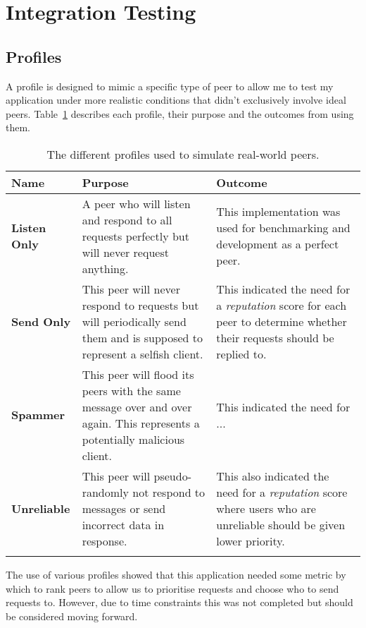\section{Integration Testing}

\subsection*{Profiles}

A profile is designed to mimic a specific type of peer to allow me to test my application under more realistic conditions that didn't exclusively involve ideal peers. Table~\ref{tab:profiles} describes each profile, their purpose and the outcomes from using them.

\small
\begin{longtable}{p{} p{} p{} }
  \toprule
  \textbf{Name} & \textbf{Purpose} & \textbf{Outcome}
  \\\midrule\midrule
  \textbf{Listen Only}
  & A peer who will listen and respond to all requests perfectly but will never request anything.
  & This implementation was used for benchmarking and development as a perfect peer.
  \\
  \textbf{Send Only}
  & This peer will never respond to requests but will periodically send them and is supposed to represent a selfish client.
  & This indicated the need for a \textit{reputation} score for each peer to determine whether their requests should be replied to.
  \\
  \textbf{Spammer}
  & This peer will flood its peers with the same message over and over again. This represents a potentially malicious client.
  & This indicated the need for ...
  \\
  \textbf{Unreliable}
  & This peer will pseudo-randomly not respond to messages or send incorrect data in response.
  & This also indicated the need for a \textit{reputation} score where users who are unreliable should be given lower priority.
  \\\bottomrule\bottomrule
  \caption{The different profiles used to simulate real-world peers.}
  \label{tab:profiles}
\end{longtable}
\normalsize

\noindent
The use of various profiles showed that this application needed some metric by which to rank peers to allow us to prioritise requests and choose who to send requests to. However, due to time constraints this was not completed but should be considered moving forward.

